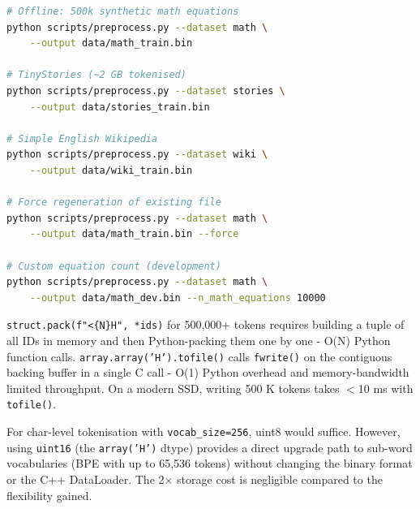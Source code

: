 \documentclass[12pt, a4paper]{article}
\begin{document}
\begin{tcolorbox}[codebox, title={Usage}]
\begin{lstlisting}[language=bash]
# Offline: 500k synthetic math equations
python scripts/preprocess.py --dataset math \
    --output data/math_train.bin

# TinyStories (~2 GB tokenised)
python scripts/preprocess.py --dataset stories \
    --output data/stories_train.bin

# Simple English Wikipedia
python scripts/preprocess.py --dataset wiki \
    --output data/wiki_train.bin

# Force regeneration of existing file
python scripts/preprocess.py --dataset math \
    --output data/math_train.bin --force

# Custom equation count (development)
python scripts/preprocess.py --dataset math \
    --output data/math_dev.bin --n_math_equations 10000
\end{lstlisting}
\end{tcolorbox}

\begin{tcolorbox}[interviewbox,
    title={Interview: Why \texttt{array.tofile()} instead of \texttt{struct.pack()} for the payload?}]
  \texttt{struct.pack(f"<\{N\}H", *ids)} for 500,000+ tokens requires building a
  tuple of all IDs in memory and then Python-packing them one by one - O(N)
  Python function calls.  \texttt{array.array('H').tofile()} calls
  \texttt{fwrite()} on the contiguous backing buffer in a single C call - O(1)
  Python overhead and memory-bandwidth limited throughput.  On a modern SSD,
  writing 500 K tokens takes $<$10 ms with \texttt{tofile()}.
\end{tcolorbox}

\begin{tcolorbox}[interviewbox,
    title={Interview: Why store tokens as uint16 instead of uint8?}]
  For char-level tokenisation with \texttt{vocab\_size=256}, uint8 would suffice.
  However, using \texttt{uint16} (the \texttt{array('H')} dtype) provides a
  direct upgrade path to sub-word vocabularies (BPE with up to 65,536 tokens)
  without changing the binary format or the C++ DataLoader.  The 2$\times$ storage
  cost is negligible compared to the flexibility gained.
\end{tcolorbox}
\end{document}
